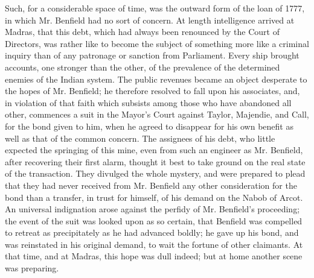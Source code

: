 Such, for a considerable space of time, was the outward form of the loan of 1777, in which Mr. Benfield had no sort of concern. At length intelligence arrived at Madras, that this debt, which had always been renounced by the Court of Directors, was rather like to become the subject of something more like a criminal inquiry than of any patronage or sanction from Parliament. Every ship brought accounts, one stronger than the other, of the prevalence of the determined enemies of the Indian system. The public revenues became an object desperate to the hopes of Mr. Benfield; he therefore resolved to fall upon his associates, and, in violation of that faith which subsists among those who have abandoned all other, commences a suit in the Mayor's Court against Taylor, Majendie, and Call, for the bond given to him, when he agreed to disappear for his own benefit as well as that of the common concern. The assignees of his debt, who little expected the springing of this mine, even from such an engineer as Mr. Benfield, after recovering their first alarm, thought it best to take ground on the real state of the transaction. They divulged the whole mystery, and were prepared to plead that they had never received from Mr. Benfield any other consideration for the bond than a transfer, in trust for himself, of his demand on the Nabob of Arcot. An universal indignation arose against the perfidy of Mr. Benfield's proceeding; the event of the suit was looked upon as so certain, that Benfield was compelled to retreat as precipitately as he had advanced boldly; he gave up his bond, and was reinstated in his original demand, to wait the fortune of other claimants. At that time, and at Madras, this hope was dull indeed; but at home another scene was preparing.

